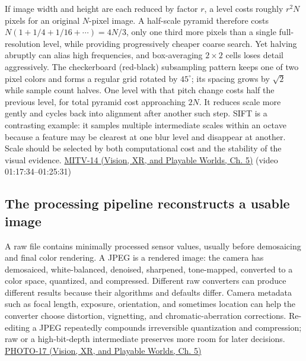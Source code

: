 If image width and height are each reduced by factor \(r\), a level costs roughly \(r^2N\) pixels for an original \(N\)-pixel image. A half-scale pyramid therefore costs \(N(1+1/4+1/16+\cdots)=4N/3\), only one third more pixels than a single full-resolution level, while providing progressively cheaper coarse search. Yet halving abruptly can alias high frequencies, and box-averaging \(2\times2\) cells loses detail aggressively. The checkerboard (red-black) subsampling pattern keeps one of two pixel colors and forms a regular grid rotated by \(45^\circ\); its spacing grows by \(\sqrt2\) while sample count halves. One level with that pitch change costs half the previous level, for total pyramid cost approaching \(2N\). It reduces scale more gently and cycles back into alignment after another such step. SIFT is a contrasting example: it samples multiple intermediate scales within an octave because a feature may be clearest at one blur level and disappear at another. Scale should be selected by both computational cost and the stability of the visual evidence. \href{../07-Vision-XR-and-Playable-Worlds/main.pdf\#nameddest=04-visual-computing-ii-ch036-mitv-14---inspection-in-patquick-hough-transform-homography-position-determination-multi-scale}{MITV-14 (Vision, XR, and Playable Worlds, Ch. 5)} (video 01:17:34--01:25:31)

\subsection{The processing pipeline reconstructs a usable image}\label{03-visual-computing-i-ch004-the-processing-pipeline-reconstructs-a-usable-image}

\hypertarget{03-visual-computing-i-ch004-the-processing-pipeline-reconstructs-a-usable-image}{}

A raw file contains minimally processed sensor values, usually before demosaicing and final color rendering. A JPEG is a rendered image: the camera has demosaiced, white-balanced, denoised, sharpened, tone-mapped, converted to a color space, quantized, and compressed. Different raw converters can produce different results because their algorithms and defaults differ. Camera metadata such as focal length, exposure, orientation, and sometimes location can help the converter choose distortion, vignetting, and chromatic-aberration corrections. Re-editing a JPEG repeatedly compounds irreversible quantization and compression; raw or a high-bit-depth intermediate preserves more room for later decisions. \href{../07-Vision-XR-and-Playable-Worlds/main.pdf\#nameddest=04-visual-computing-ii-ch036-photo-17---photography-session-17}{PHOTO-17 (Vision, XR, and Playable Worlds, Ch. 5)}

